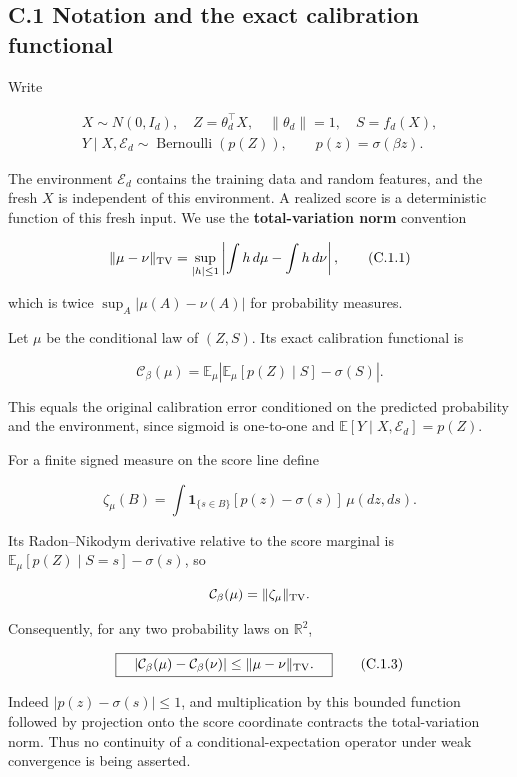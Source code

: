 \documentclass[
  11pt,
  a4paper,
]{article}
\begin{document}
\hypertarget{c.1-notation-and-the-exact-calibration-functional}{%
\subsection{C.1 Notation and the exact calibration
functional}\label{c.1-notation-and-the-exact-calibration-functional}}

Write

\[
\begin{gathered}
X\sim N(0,I_d),\quad Z=\theta_d^\top X,\quad \|\theta_d\|=1,\quad S=f_d(X),\\
Y\mid X,\mathcal E_d\sim\operatorname{Bernoulli}(p(Z)),\qquad p(z)=\sigma(\beta z).
\end{gathered}
\]

The environment \(\mathcal E_d\) contains the training data and random
features, and the fresh \(X\) is independent of this environment. A
realized score is a deterministic function of this fresh input. We use
the \textbf{total-variation norm} convention

\[
\|\mu-\nu\|_{\rm TV}
 =\sup_{|h|\le1}\left|\int h\,d\mu-\int h\,d\nu\right|,
\tag{C.1.1}
\]

which is twice \(\sup_A|\mu(A)-\nu(A)|\) for probability measures.

Let \(\mu\) be the conditional law of \((Z,S)\). Its exact calibration
functional is

\[
\mathcal C_\beta(\mu)
 =\mathbb E_\mu\left|
       \mathbb E_\mu[p(Z)\mid S]-\sigma(S)\right|.
\tag{C.1.2}
\]

This equals the original calibration error conditioned on the predicted
probability and the environment, since sigmoid is one-to-one and
\(\mathbb E[Y\mid X,\mathcal E_d]=p(Z)\).

For a finite signed measure on the score line define

\[
\zeta_\mu(B)=\int\mathbf1_{\{s\in B\}}
                    [p(z)-\sigma(s)]\,\mu(dz,ds).
\]

Its Radon--Nikodym derivative relative to the score marginal is
\(\mathbb E_\mu[p(Z)\mid S=s]-\sigma(s)\), so

\[
\mathcal C_\beta(\mu)=\|\zeta_\mu\|_{\rm TV}.
\]

Consequently, for any two probability laws on \(\mathbb R^2\),

\[
\boxed{\quad
 |\mathcal C_\beta(\mu)-\mathcal C_\beta(\nu)|
 \le \|\mu-\nu\|_{\rm TV}.
 \quad}
\tag{C.1.3}
\]

Indeed \(|p(z)-\sigma(s)|\le1\), and multiplication by this bounded
function followed by projection onto the score coordinate contracts the
total-variation norm. Thus no continuity of a conditional-expectation
operator under weak convergence is being asserted.
\end{document}
